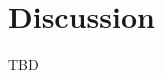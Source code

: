 \documentclass[fleqn,10pt]{wlscirep}
\begin{document}

\section*{Discussion}
  \label{disc}
  TBD




\end{document}
